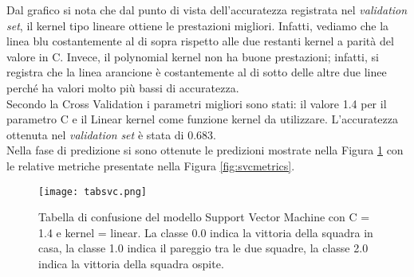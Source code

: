 Dal grafico si nota che dal punto di vista dell'accuratezza registrata nel \emph{validation} \emph{set}, il kernel tipo lineare ottiene le prestazioni migliori. Infatti, vediamo che la linea blu costantemente al di sopra rispetto alle due restanti kernel a parità del valore in C. Invece, il polynomial kernel non ha buone prestazioni; infatti, si registra che la linea arancione è costantemente al di sotto delle altre due linee perché ha valori molto più bassi di accuratezza.\\
Secondo la Cross Validation i parametri migliori sono stati: il valore 1.4 per il parametro C e il Linear kernel come funzione kernel da utilizzare.
L'accuratezza ottenuta nel \emph{validation} \emph{set} è stata di 0.683.\\ Nella fase di predizione si sono ottenute le predizioni mostrate nella Figura \ref{fig:tabsvc} con le relative metriche presentate nella Figura \ref{fig:svcmetrics}.
\begin{figure}[]
	\begin{center}
		\texttt{[image: tabsvc.png]}
		\caption{Tabella di confusione del modello Support Vector Machine con C = 1.4 e kernel = linear. La classe 0.0 indica la vittoria della squadra in casa, la classe 1.0 indica il pareggio tra le due squadre, la classe 2.0 indica la vittoria della squadra ospite.
		} 
		\label{fig:tabsvc}
	\end{center}
\end{figure}

